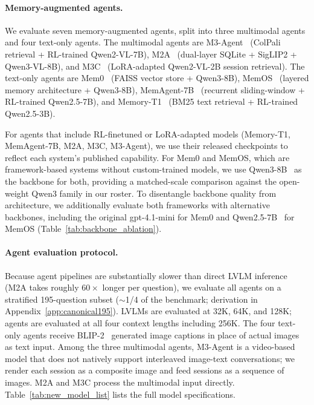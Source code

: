 \documentclass{llmxive}
\begin{document}
\paragraph{Memory-augmented agents.}
We evaluate seven memory-augmented agents, split into three multimodal agents and four text-only agents. The multimodal agents are M3-Agent~\cite{long2025seeinglisteningrememberingreasoning} (ColPali~\cite{faysse2025colpaliefficientdocumentretrieval} retrieval + RL-trained Qwen2-VL-7B), M2A~\cite{m2a} (dual-layer SQLite + SigLIP2 + Qwen3-VL-8B), and M3C~\cite{jang2025enablingchatbotseyesears} (LoRA-adapted Qwen2-VL-2B session retrieval). The text-only agents are Mem0~\cite{mem0} (FAISS vector store + Qwen3-8B), MemOS~\cite{li2025memosoperatingmemoryaugmentedgeneration} (layered memory architecture + Qwen3-8B), MemAgent-7B~\cite{yu2025memagentreshapinglongcontextllm} (recurrent sliding-window + RL-trained Qwen2.5-7B), and Memory-T1~\cite{du2025memoryt1reinforcementlearningtemporal} (BM25 text retrieval + RL-trained Qwen2.5-3B).

For agents that include RL-finetuned or LoRA-adapted models (Memory-T1, MemAgent-7B, M2A, M3C, M3-Agent), we use their released checkpoints to reflect each system's published capability. For Mem0 and MemOS, which are framework-based systems without custom-trained models, we use Qwen3-8B~\citep{yang2025qwen3technicalreport} as the backbone for both, providing a matched-scale comparison against the open-weight Qwen3 family in our roster. To disentangle backbone quality from architecture, we additionally evaluate both frameworks with alternative backbones, including the original gpt-4.1-mini for Mem0 and Qwen2.5-7B~\citep{qwen2024qwen25} for MemOS (Table~\ref{tab:backbone_ablation}).

\paragraph{Agent evaluation protocol.}
Because agent pipelines are substantially slower than direct LVLM inference (M2A takes roughly $60\times$ longer per question), we evaluate all agents on a stratified 195-question subset ($\sim$1/4 of the benchmark; derivation in Appendix~\ref{app:canonical195}). LVLMs are evaluated at 32K, 64K, and 128K; agents are evaluated at all four context lengths including 256K. The four text-only agents receive BLIP-2~\cite{li2023blip2} generated image captions in place of actual images as text input. Among the three multimodal agents, M3-Agent is a video-based model that does not natively support interleaved image-text conversations; we render each session as a composite image and feed sessions as a sequence of images. M2A and M3C process the multimodal input directly. Table~\ref{tab:new_model_list} lists the full model specifications.
\end{document}
